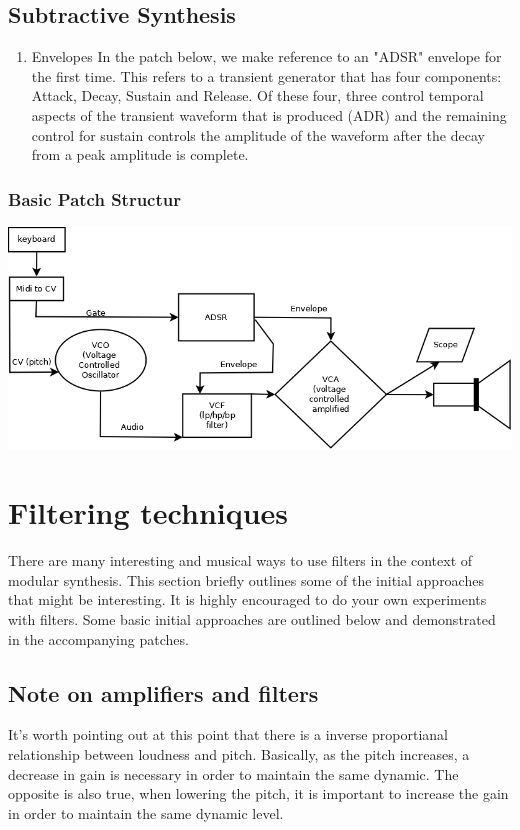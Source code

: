 \documentclass[11pt]{article}
\begin{document}
\subsection{Subtractive Synthesis}
\label{sec:orgd9ee3a3}

\begin{enumerate}
\item Envelopes
\label{sec:org30946e0}
In the patch below, we make reference to an "ADSR" envelope for the
first time. This refers to a transient generator that has four
components: Attack, Decay, Sustain and Release. Of these four, three
control temporal aspects of the transient waveform that is produced
(ADR) and the remaining control for sustain controls the amplitude of
the waveform after the decay from a peak amplitude is complete.
\end{enumerate}

\subsubsection{Basic Patch Structur}
\label{sec:org613f4bb}
\begin{center}
\includegraphics[width=.9\linewidth]{./basicSubtractive.png}
\end{center}

\section{Filtering techniques}
\label{sec:orgd55e2cb}
There are many interesting and musical ways to use filters in the
context of modular synthesis. This section briefly outlines some of
the initial approaches that might be interesting. It is highly
encouraged to do your own experiments with filters. Some basic initial
approaches are outlined below and demonstrated in the accompanying
patches. 

\subsection{Note on amplifiers and filters}
\label{sec:org6f47bcb}
It's worth pointing out at this point that there is a inverse proportianal
relationship between loudness and pitch. Basically, as the pitch
increases, a decrease in gain is necessary in order to maintain the
same dynamic. The opposite is also true, when lowering the pitch, it
is important to increase the gain in order to maintain the same
dynamic level. 
\end{document}
